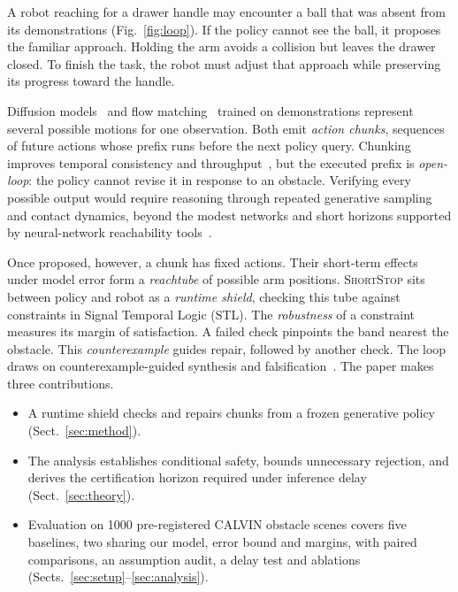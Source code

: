 \documentclass[runningheads]{llncs}
\newcommand{\sys}{\textsc{ShortStop}}
\begin{document}
A robot reaching for a drawer handle may encounter a ball that was absent
from its demonstrations (Fig.~\ref{fig:loop}). If the policy cannot see the
ball, it proposes the familiar approach. Holding the arm avoids a collision
but leaves the drawer closed. To finish the task, the robot must adjust
that approach while preserving its progress toward the handle.

Diffusion models~\cite{chi2023diffusion,janner2022planning} and flow
matching~\cite{lipman2023flow} trained on demonstrations represent several
possible motions for one observation. Both emit \emph{action chunks},
sequences of future actions whose prefix runs before the next policy query.
Chunking improves temporal consistency and throughput~\cite{chi2023diffusion},
but the executed prefix is \emph{open-loop}: the policy cannot revise it
in response to an obstacle. Verifying every possible output would require
reasoning through repeated generative sampling and contact dynamics,
beyond the modest networks and short horizons supported by
neural-network reachability tools~\cite{tran2020nnv,everett2021reachability}.

Once proposed, however, a chunk has fixed actions. Their short-term effects
under model error form a \emph{reachtube} of possible arm positions.
\sys{} sits between policy and robot as a \emph{runtime shield}, checking
this tube against constraints in Signal Temporal Logic (STL). The
\emph{robustness} of a constraint measures its margin of satisfaction.
A failed check pinpoints the band nearest the obstacle. This
\emph{counterexample} guides repair, followed by another check. The loop
draws on counterexample-guided synthesis and
falsification~\cite{solar2006sketching,clarke2000cegar,annpureddy2011staliro}.
The paper makes three contributions.

\begin{itemize}
\item A runtime shield checks and repairs chunks from a frozen generative
policy (Sect.~\ref{sec:method}).
\item The analysis establishes conditional safety, bounds unnecessary
rejection, and derives the certification horizon required under inference delay
(Sect.~\ref{sec:theory}).
\item Evaluation on 1000 pre-registered CALVIN obstacle scenes covers five
baselines, two sharing our model, error bound and margins, with paired
comparisons, an assumption audit, a delay test and ablations
(Sects.~\ref{sec:setup}--\ref{sec:analysis}).
\end{itemize}
\end{document}
